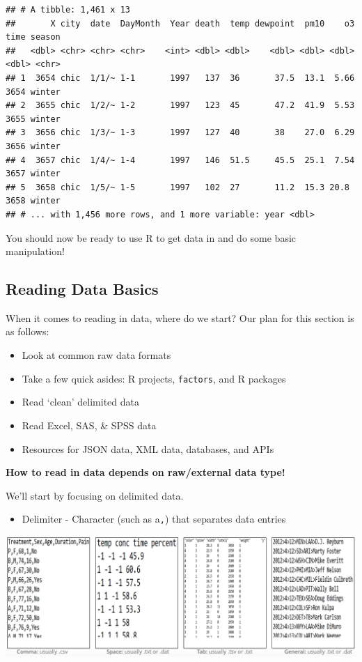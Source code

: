 \documentclass[
]{book}
\providecommand{\tightlist}{%
  \setlength{\itemsep}{0pt}\setlength{\parskip}{0pt}}
\theoremstyle{definition}
\theoremstyle{definition}
\theoremstyle{definition}
\theoremstyle{remark}
\begin{document}
\begin{verbatim}
## # A tibble: 1,461 x 13
##       X city  date  DayMonth  Year death  temp dewpoint  pm10    o3  time season
##   <dbl> <chr> <chr> <chr>    <int> <dbl> <dbl>    <dbl> <dbl> <dbl> <dbl> <chr> 
## 1  3654 chic  1/1/~ 1-1       1997   137  36       37.5  13.1  5.66  3654 winter
## 2  3655 chic  1/2/~ 1-2       1997   123  45       47.2  41.9  5.53  3655 winter
## 3  3656 chic  1/3/~ 1-3       1997   127  40       38    27.0  6.29  3656 winter
## 4  3657 chic  1/4/~ 1-4       1997   146  51.5     45.5  25.1  7.54  3657 winter
## 5  3658 chic  1/5/~ 1-5       1997   102  27       11.2  15.3 20.8   3658 winter
## # ... with 1,456 more rows, and 1 more variable: year <dbl>
\end{verbatim}

You should now be ready to use R to get data in and do some basic manipulation!

\hypertarget{reading-data-basics-1}{%
\subsection{Reading Data Basics}\label{reading-data-basics-1}}

When it comes to reading in data, where do we start? Our plan for this section is as follows:

\begin{itemize}
\item
  Look at common raw data formats
\item
  Take a few quick asides: R projects, \texttt{factors}, and R packages
\item
  Read `clean' delimited data
\item
  Read Excel, SAS, \& SPSS data
\item
  Resources for JSON data, XML data, databases, and APIs
\end{itemize}

\textbf{How to read in data depends on raw/external data type!}

We'll start by focusing on delimited data.

\begin{itemize}
\tightlist
\item
  Delimiter - Character (such as a\texttt{,}) that separates data entries
\end{itemize}

\begin{center}\includegraphics[width=0.8\linewidth]{img/delimitedData} \end{center}
\end{document}
